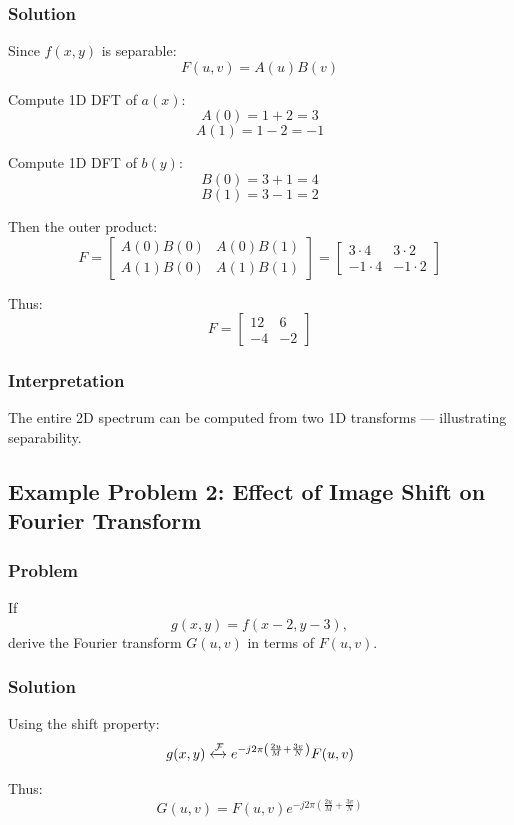 \documentclass{AnantDocumentation}
\begin{document}
\subsubsection*{Solution}

Since $f(x,y)$ is separable:
\[
F(u,v) = A(u) B(v)
\]

Compute 1D DFT of $a(x)$:
\[
A(0) = 1 + 2 = 3
\]
\[
A(1) = 1 - 2 = -1
\]

Compute 1D DFT of $b(y)$:
\[
B(0) = 3 + 1 = 4
\]
\[
B(1) = 3 - 1 = 2
\]

Then the outer product:
\[
F =
\begin{bmatrix}
A(0)B(0) & A(0)B(1)\\
A(1)B(0) & A(1)B(1)
\end{bmatrix}
=
\begin{bmatrix}
3\cdot 4 & 3\cdot 2\\
-1\cdot 4 & -1\cdot 2
\end{bmatrix}
\]

Thus:
\[
F =
\begin{bmatrix}
12 & 6\\
-4 & -2
\end{bmatrix}
\]

\subsubsection*{Interpretation}
The entire 2D spectrum can be computed from two 1D transforms — illustrating separability.

\subsection{Example Problem 2: Effect of Image Shift on Fourier Transform}

\subsubsection*{Problem}
If
\[
g(x,y) = f(x-2, y-3),
\]
derive the Fourier transform $G(u,v)$ in terms of $F(u,v)$.

\subsubsection*{Solution}

Using the shift property:
\[
g(x,y) \xleftrightarrow{\mathcal{F}}
e^{-j2\pi\left(\frac{2u}{M} + \frac{3v}{N}\right)} F(u,v)
\]

Thus:
\[
G(u,v) = F(u,v) e^{-j2\pi\left(\frac{2u}{M} + \frac{3v}{N}\right)}
\]
\end{document}
